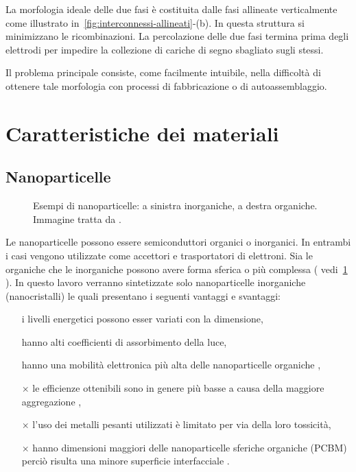 La morfologia ideale delle due fasi è costituita dalle fasi allineate verticalmente \cite{fv-morf-allineata} come illustrato in~\ref{fig:interconnessi-allineati}-(b). In questa struttura si minimizzano le ricombinazioni. La percolazione delle due fasi termina prima degli elettrodi per impedire la collezione di cariche di segno sbagliato sugli stessi.
      

Il problema principale consiste, come facilmente intuibile, nella difficoltà di ottenere tale morfologia con processi di fabbricazione o di autoassemblaggio.

\section{Caratteristiche dei materiali}

\subsection{Nanoparticelle}
\begin{figure}
\caption{\footnotesize{Esempi di nanoparticelle: a sinistra inorganiche, a destra organiche. Immagine tratta da \cite{fv-all}.}
\label{fig:NPs}}
\end{figure}
Le nanoparticelle possono essere semiconduttori organici o inorganici. In entrambi i casi vengono utilizzate come accettori e trasportatori di elettroni. Sia le organiche che le inorganiche possono avere forma sferica o più complessa ( vedi~\ref{fig:NPs} ). In questo lavoro verranno sintetizzate solo nanoparticelle inorganiche (nanocristalli) le quali presentano i seguenti vantaggi e svantaggi:
\begin{itemize}
 \item[\checkmark] i livelli energetici possono esser variati con la dimensione,
 \item[\checkmark] hanno alti coefficienti di assorbimento della luce,
 \item[\checkmark] hanno una mobilità elettronica più alta delle nanoparticelle organiche \cite{fv-CdSe-OA},
 \item[$\times$] le efficienze ottenibili sono in genere più basse a causa della maggiore aggregazione \cite{fv-all}, 
 \item[$\times$] l'uso dei metalli pesanti utilizzati è limitato per via della loro tossicità,
 \item[$\times$] hanno dimensioni maggiori delle nanoparticelle sferiche organiche (PCBM) perciò risulta una minore superficie interfacciale \cite{fv-all}.
\end{itemize}
